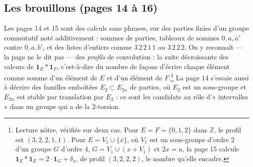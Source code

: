 \documentclass[11pt,a4paper]{article}
\begin{document}
\subsection*{Les brouillons (pages 14 à 16)}

Les pages 14 et 15 sont des calculs sans phrases, sur des parties finies d'un
groupe commutatif noté additivement : sommes de parties, tableaux de sommes
$0, a, a'$ contre $0, a, b'$, et des listes d'entiers comme $3\,2\,2\,1\,1$ ou
$3\,2\,2\,2$. On y reconnaît --- la page ne le dit pas --- des \emph{profils}
de convolution : la suite décroissante des valeurs de
$\mathbf{1}_E * \mathbf{1}_F$, c'est-à-dire du nombre de façons d'écrire
chaque élément comme somme d'un élément de $E$ et d'un élément de
$F$.\footnote{Lecture nôtre, vérifiée sur deux cas. Pour $E = F = \{0, 1, 2\}$
dans $\mathbb{Z}$, le profil est $(3, 2, 2, 1, 1)$. Pour $E = V_1 \cup \{x\}$,
où $V_1$ est un sous-groupe d'ordre $2$ d'un groupe $G$ d'ordre $4$,
$G = V_1 \cup (x + V_1)$ et $2x = u$, la page 15 calcule
$\mathbf{1}_E * \mathbf{1}_E = 2 \cdot \mathbf{1}_G + \delta_u$, de profil
$(3, 2, 2, 2)$, le nombre qu'elle encadre.} La page 14 s'essaie aussi à
décrire des familles emboîtées $E_2 \subset E_{2n}$ de parties, où $E_2$ est
un sous-groupe et $E_{2n}$ est stable par translation par $E_2$ : ce sont les
candidats au rôle d'« intervalles » dans un groupe qui a de la $2$-torsion.
\end{document}
